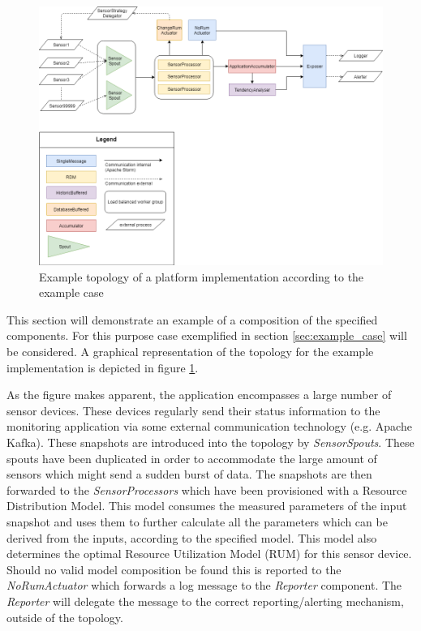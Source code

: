 \begin{figure}
\centering
\includegraphics[width=\textwidth]{resources/img/example_topology.png}
\caption{Example topology of a platform implementation according to the example case}
\label{fig:example_topology}
\end{figure}

This section will demonstrate an example of a composition of the specified components. For this purpose case exemplified in section \ref{sec:example_case} will be considered. A graphical representation of the topology for the example implementation is depicted in figure \ref{fig:example_topology}. 

As the figure makes apparent, the application encompasses a large number of sensor devices. These devices regularly send their status information to the monitoring application via some external communication technology (e.g. Apache Kafka). These snapshots are introduced into the topology by \emph{SensorSpouts}. These spouts have been duplicated in order to accommodate the large amount of sensors which might send a sudden burst of data. The snapshots are then forwarded to the \emph{SensorProcessors} which have been provisioned with a Resource Distribution Model. This model consumes the measured parameters of the input snapshot and uses them to further calculate all the parameters which can be derived from the inputs, according to the specified model. This model also determines the optimal Resource Utilization Model (RUM) for this sensor device. Should no valid model composition be found this is reported to the \emph{NoRumActuator} which forwards a log message to the \emph{Reporter} component. The \emph{Reporter} will delegate the message to the correct reporting/alerting mechanism, outside of the topology. 

